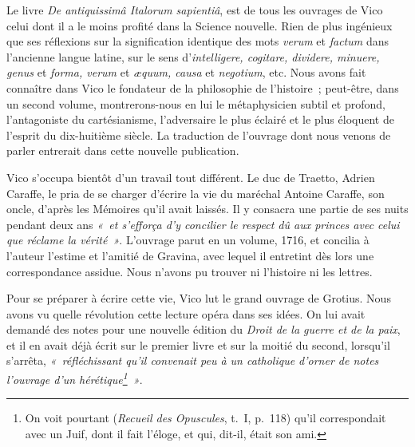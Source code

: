 \documentclass[french,twoside]{book} %
\begin{document}
Le livre {\itshape De antiquissimâ Italorum sapientiâ}, est de tous les ouvrages de Vico celui dont il a le moins profité dans la Science nouvelle. Rien de plus ingénieux que ses réflexions sur la signification identique des mots {\itshape verum} et {\itshape factum} dans l’ancienne langue latine, sur le sens d’{\itshape intelligere, cogitare, dividere, minuere, genus} et {\itshape forma, verum} et {\itshape æquum, causa} et {\itshape negotium}, etc. Nous avons fait connaître dans Vico le fondateur de la philosophie de l’histoire ; peut-être, dans un second volume, montrerons-nous en lui le métaphysicien subtil et profond, l’antagoniste du cartésianisme, l’adversaire le plus éclairé et le plus éloquent de l’esprit du dix-huitième siècle. La traduction de l’ouvrage dont nous venons de parler entrerait dans cette nouvelle publication.\par
\par
 Vico s’occupa bientôt d’un travail tout différent. Le duc de Traetto, Adrien Caraffe, le pria de se charger d’écrire la vie du maréchal Antoine Caraffe, son oncle, d’après les Mémoires qu’il avait laissés. Il y consacra une partie de ses nuits pendant deux ans \emph{« et s’efforça d’y concilier le respect dû aux princes avec celui que réclame la vérité »}. L’ouvrage parut en un volume, 1716, et concilia à l’auteur l’estime et l’amitié de Gravina, avec lequel il entretint dès lors une correspondance assidue. Nous n’avons pu trouver ni l’histoire ni les lettres.\par
Pour se préparer à écrire cette vie, Vico lut le grand ouvrage de Grotius. Nous avons vu quelle révolution cette lecture opéra dans ses idées. On lui avait demandé des notes pour une nouvelle édition du {\itshape Droit de la guerre et de la paix}, et il en avait déjà écrit sur le premier livre et sur la moitié du second, lorsqu’il s’arrêta, \emph{« réfléchissant qu’il convenait peu à un catholique d’orner de notes l’ouvrage d’un hérétique\footnote{On voit pourtant ({\itshape Recueil des Opuscules}, t. I, p. 118) qu’il correspondait avec un Juif, dont il fait l’éloge, et qui, dit-il, était son ami.} »}.\par
\end{document}
